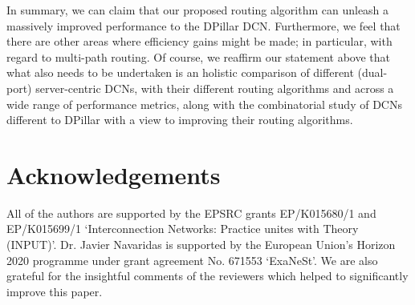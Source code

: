 \documentclass{article}
\begin{document}
In summary, we can claim that our proposed routing algorithm can unleash a massively improved performance to the DPillar DCN. Furthermore, we feel that there are other areas where efficiency gains might be made; in particular, with regard to multi-path routing. Of course, we reaffirm our statement above that what also needs to be undertaken is an holistic comparison of different (dual-port) server-centric DCNs, with their different routing algorithms and across a wide range of performance metrics, along with the combinatorial study of DCNs different to DPillar with a view to improving their routing algorithms.

\section*{Acknowledgements}

All of the authors are supported by the EPSRC grants EP/K015680/1 and EP/K015699/1 `Interconnection Networks: Practice unites with Theory (INPUT)'. Dr. Javier Navaridas is supported by the European Union's Horizon 2020 programme under grant agreement No. 671553 `ExaNeSt'. We are also grateful for the insightful comments of the reviewers which helped to significantly improve this paper.
\end{document}
